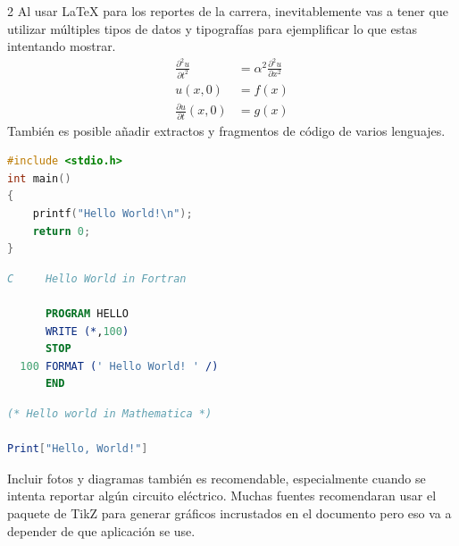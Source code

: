 \documentclass[12pt]{article}
\begin{document}
\begin{multicols}{2}
Al usar LaTeX para los reportes de la carrera, inevitablemente vas a tener que utilizar múltiples tipos de datos y tipografías para ejemplificar lo que estas intentando mostrar.\\

\begin{align*}
    \frac{\partial ^2 u}{\partial t^2} &= \alpha ^2 \frac{\partial ^2 u}{\partial x^2} \\
    u(x,0)  &= f(x) \\
    \frac{\partial u}{\partial t}(x,0) &= g(x)
\end{align*}
También es posible añadir extractos y fragmentos de código de varios lenguajes.\\

\begin{lstlisting}[language=C, caption=Hola Mundo en C]
#include <stdio.h>
int main()
{
    printf("Hello World!\n");
    return 0;
}
\end{lstlisting}
\begin{lstlisting}[language=Fortran, caption=Hola Mundo en FORTRAN]
C     Hello World in Fortran

      PROGRAM HELLO
      WRITE (*,100)
      STOP
  100 FORMAT (' Hello World! ' /)
      END
\end{lstlisting}
\begin{lstlisting}[language=Mathematica, caption=Hola Mundo en Mathematica]
(* Hello world in Mathematica *)

Print["Hello, World!"]
\end{lstlisting}
Incluir fotos y diagramas también es recomendable, especialmente cuando se intenta reportar algún circuito eléctrico. Muchas fuentes recomendaran usar el paquete de TikZ para generar gráficos incrustados en el documento pero eso va a depender de que aplicación se use.


\end{multicols}
\end{document}
